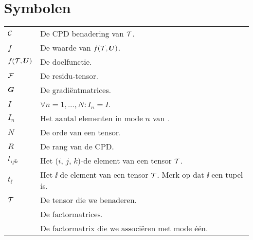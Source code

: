 \documentclass[master=cws ,masteroption=gs]{kulemt}
\begin{document}
\section*{Symbolen}
\begin{flushleft}
	\renewcommand{\arraystretch}{1.1}
	\begin{tabularx}{\textwidth}{@{}p{12mm}X@{}}
		$\mathcal{C}$	& De CPD benadering van $\mathcal{T}$.\\
		$f$				& De waarde van $f(\mathcal{T}, \boldsymbol{U})$.\\
		$f(\mathcal{T}, \boldsymbol{U})$	& De doelfunctie.\\
		$\mathcal{F}$		& De residu-tensor.\\
		$\boldsymbol{G}$			& De gradi\"entmatrices.\\
		$I$				& $\forall n = 1, \ldots, N: I_n = I$.\\
		$I_n$			& Het aantal elementen in mode $n$ van \TT.\\
		$N$				& De orde van een tensor.\\
		$R$				& De rang van de CPD.\\
		$t_{ijk}$		& Het ($i$, $j$, $k$)-de element van een tensor $\mathcal{T}$.\\
		$t_{\ii}$		& Het $\ii$-de element van een tensor $\mathcal{T}$. Merk op dat $\ii$ een tupel is.\\
		$\mathcal{T}$		& De tensor die we benaderen.\\
		\UUU{}			& De factormatrices.\\
		\UU{1}			& De factormatrix die we associ\"eren met mode \'e\'en.\\
	\end{tabularx}
\end{flushleft}

\mainmatter












\appendixpage*          %
\appendix



\backmatter


\end{document}
